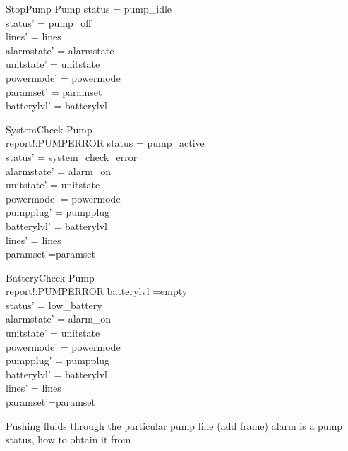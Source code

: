 \documentclass{article}
\begin{document}
		
	\begin{schema}{StopPump}
		\Delta Pump
	\where
		status = pump\_idle \\ 
		status' = pump\_off \\
		lines' = lines  \\
    	alarmstate' = alarmstate \\
    	unitstate' = unitstate \\
    	powermode' = powermode \\
		paramset' = paramset\\
		batterylvl' = batterylvl
	\end{schema}	
			
	
			
	\begin{schema}{SystemCheck}
		\Delta Pump\\
		
		report!:PUMPERROR
	\where 
		status = pump_active\\
		status' = system_check_error\\
	alarmstate' = alarm_on \\
	unitstate' = unitstate \\
	powermode' = powermode \\
	pumpplug' = pumpplug\\
	batterylvl' = batterylvl\\
	lines' = lines\\
	paramset'=paramset\\
	\end{schema}
	
		\begin{schema}{BatteryCheck}
			\Delta Pump\\
			
			report!:PUMPERROR
			\where 
			batterylvl =empty\\
			status' = low_battery\\
			alarmstate' = alarm_on \\
			unitstate' = unitstate \\
			powermode' = powermode \\
			pumpplug' = pumpplug\\
			batterylvl' = batterylvl\\
			lines' = lines\\
			paramset'=paramset\\
		\end{schema}
	
	
	Pushing fluids through the particular pump line (add frame) alarm is a pump status, how to obtain it from
	
\end{document}
